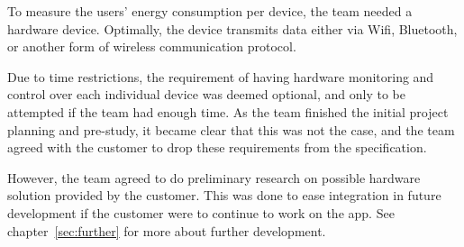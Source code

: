 \noindent To measure the users' energy consumption per device, the team needed a hardware device. Optimally, the device transmits  data either via Wifi, Bluetooth, or another form of wireless communication protocol.

Due to time restrictions, the requirement of having hardware monitoring and control over each individual device was deemed optional, and only to be attempted if the team had enough time. As the team finished the initial project planning and pre-study, it became clear that this was not the case, and the team agreed with the customer to drop these requirements from the specification. 

However, the team agreed to do preliminary research on possible hardware solution provided by the customer. This was done to ease integration in future development if the customer were to continue to work on the app. See chapter~\ref{sec:further} for more about further development.
\newpage
 

